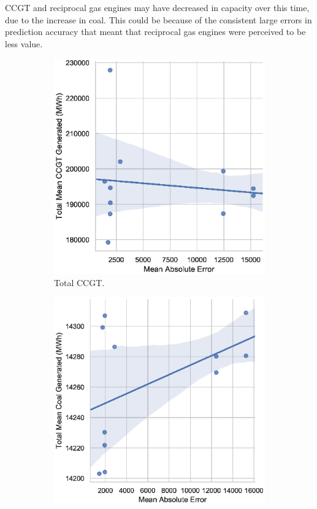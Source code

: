 \documentclass[final,3p,times,twocolumn,numbers]{elsarticle}
\begin{document}
CCGT and reciprocal gas engines may have decreased in capacity over this time, due to the increase in coal. This could be because of the consistent large errors in prediction accuracy that meant that reciprocal gas engines were perceived to be less value.


\begin{figure}
\begin{subfigure}[b]{0.475\textwidth}
\centering
\includegraphics[width=\columnwidth]{figures/results/elecsim_results/total_CCGT_mean_output.eps}
\caption{Total CCGT.}
\label{fig:total_CCGT_mean_output}
\end{subfigure}
\hfill
\begin{subfigure}[b]{0.475\textwidth}  
\includegraphics[width=\columnwidth]{figures/results/elecsim_results/total_Coal_mean_output.eps}

\end{subfigure}
\end{figure}
\end{document}
